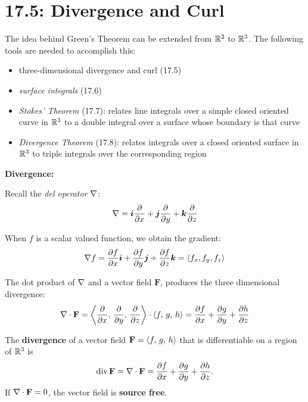 \documentclass[mathNotesPreamble]{subfiles}
\begin{document}
\section{17.5: Divergence and Curl}

  The idea behind Green's Theorem can be extended from $\mathbb{R}^2$ to $\mathbb{R}^3$. The following tools are needed to accomplish this:
  \begin{itemize}
    \item 
      three-dimensional divergence and curl (17.5)
    \item 
      \textit{surface integrals} (17.6)
    \item 
      \textit{Stokes' Theorem} (17.7): relates line integrals over a simple closed oriented curve in $\mathbb{R}^3$ to a double integral over a surface whose boundary is that curve
    \item 
      \textit{Divergence Theorem} (17.8): relates integrals over a closed oriented surface in $\mathbb{R}^3$ to triple integrals over the corresponding region
  \end{itemize}

  \noindent 
  \textbf{Divergence:}

  Recall the \textit{del operator} $\nabla$:
    \[\nabla={\bm{i}}\frac{\partial}{\partial x}+{\bm{j}}\frac{\partial}{\partial y}+{\bm{k}}\frac{\partial}{\partial z}\]

  When $f$ is a scalar valued function, we obtain the gradient:
    \[\nabla f=\frac{\partial f}{\partial x}{\bm{i}}+\frac{\partial f}{\partial y}{\bm{j}}+\frac{\partial f}{\partial z}{\bm{k}}={\left\langle f_x, f_y, f_z \right\rangle}\]

  The dot product of $\nabla$ and a vector field $\mathbf F$, produces the three dimensional divergence:
    \[\nabla\cdot\mathbf F={\left\langle \frac{\partial}{\partial x},\,\frac{\partial}{\partial y},\,\frac{\partial}{\partial z} \right\rangle}\cdot{\left\langle f,\,g,\,h \right\rangle}=\frac{\partial f}{\partial x}+\frac{\partial g}{\partial y}+\frac{\partial h}{\partial z}\]

  \begin{defn*}
    The \textbf{divergence} of a vector field $\mathbf F={\left\langle f,\,g,\,h \right\rangle}$ that is differentiable on a region of $\mathbb{R}^3$ is 
      \[\operatorname{div} \mathbf F=\nabla\cdot\mathbf F=\frac{\partial f}{\partial x}+\frac{\partial g}{\partial y}+\frac{\partial h}{\partial z}.\]
    If $\nabla\cdot\mathbf F=0$, the vector field is \textbf{source free}.
  \end{defn*}
  \pagebreak
\end{document}
